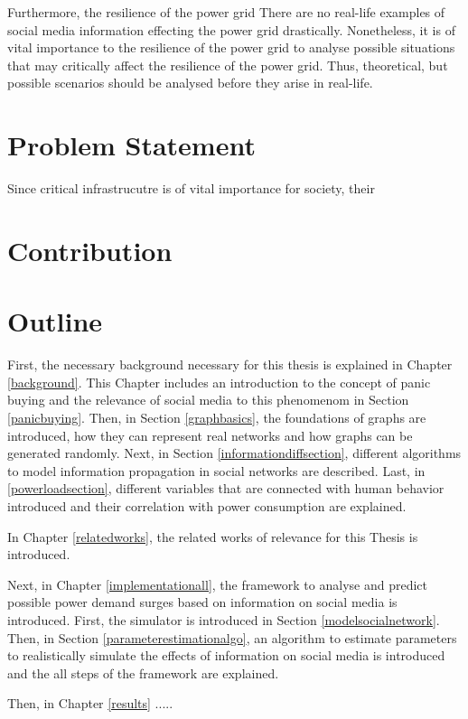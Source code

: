 Furthermore, the resilience of the power grid
There are no real-life examples of social media information 
effecting the power grid drastically. Nonetheless, it is of vital importance 
to the resilience of the power grid to analyse possible situations that 
may critically affect the resilience of the power grid. Thus,
theoretical, but possible scenarios should be analysed before they
arise in real-life.


\section{Problem Statement}
\label{problemstatement}

Since critical infrastrucutre is of vital importance for society,
their 

\section{Contribution}
\label{contribution}
\section{Outline}
\label{outline}

First, the necessary background necessary for this thesis is explained
in Chapter \ref{background}. This Chapter includes an introduction
to the concept of panic buying and the relevance of social media 
to this phenomenom in Section \ref{panicbuying}. Then, in 
Section \ref{graphbasics}, the foundations of graphs are introduced,
how they can represent real networks and how graphs can be
generated randomly. Next, in Section \ref{informationdiffsection},
different algorithms to model information propagation in 
social networks are described. Last, in \ref{powerloadsection},
different variables that are connected with human behavior
introduced and their correlation with power consumption are 
explained.

In Chapter \ref{relatedworks}, the related works of relevance for 
this Thesis is introduced.

Next, in Chapter \ref{implementationall}, the framework to
analyse and predict possible power demand surges based on
information on social media is introduced.
First, the simulator is introduced in Section \ref{modelsocialnetwork}.
Then, in Section \ref{parameterestimationalgo}, 
an algorithm to estimate parameters to realistically simulate
the effects of information on social media is introduced and 
the all steps of the framework are explained.

Then, in Chapter \ref{results} .....